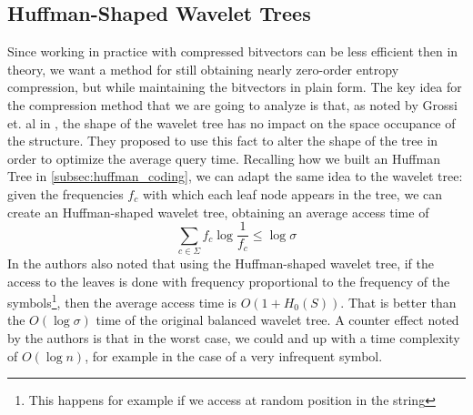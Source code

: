 \subsection{Huffman-Shaped Wavelet Trees}
Since working in practice with compressed bitvectors can be less efficient then in theory, we want a method for still obtaining nearly zero-order entropy compression, but while maintaining the bitvectors in plain form. The key idea for the compression method that we are going to analyze is that, as noted by Grossi et. al in \cite{grossi2004indexing}, the shape of the wavelet tree has no impact on the space occupance of the structure. They proposed to use this fact to alter the shape of the tree in order to optimize the average query time. Recalling how we built an Huffman Tree in \ref{subsec:huffman_coding}, we can adapt the same idea to the wavelet tree: given the frequencies $f_c$ with which each leaf node appears in the tree, we can create an Huffman-shaped wavelet tree, obtaining an average access time of
\begin{equation}
    \sum_{c \in \Sigma} f_c \log \frac{1}{f_c} \leq \log \sigma
\end{equation}
In \cite{grossi2004indexing} the authors also noted that using the Huffman-shaped wavelet tree, if the access to the leaves is done with frequency proportional to the frequency of the symbols\footnote{This happens for example if we access at random position in the string}, then the average access time is $O(1 + H_0(S))$. That is better than the $O(\log \sigma)$ time of the original balanced wavelet tree. A counter effect noted by the authors is that in the worst case, we could and up with a time complexity of $O(\log n)$, for example in the case of a very infrequent symbol. \vspace{0.4cm}


